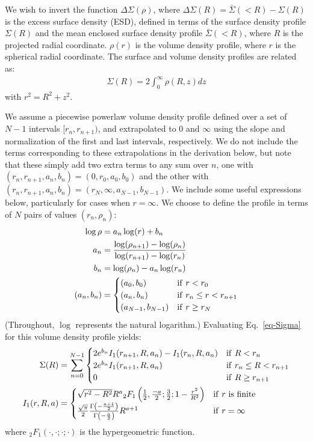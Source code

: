 \documentclass{article}
\begin{document}
We wish to invert the function $\Delta\Sigma(\rho)$, where $\Delta\Sigma(R) = \bar{\Sigma}(<R) - \Sigma(R)$ is the excess surface density (ESD), defined in terms of the surface density profile $\Sigma(R)$ and the mean enclosed surface density profile $\bar{\Sigma}(<R)$, where $R$ is the projected radial coordinate. $\rho(r)$ is the volume density profile, where $r$ is the spherical radial coordinate. The surface and volume density profiles are related as:
\begin{align}
  \Sigma(R) = 2\int_0^\infty\rho(R, z)dz\label{eq-Sigma}
\end{align}
with $r^2 = R^2 + z^2$.

We assume a piecewise powerlaw volume density profile defined over a set of $N-1$ intervals $[r_n, r_{n+1})$, and extrapolated to $0$ and $\infty$ using the slope and normalization of the first and last intervals, respectively. We do not include the terms corresponding to these extrapolations in the derivation below, but note that these simply add two extra terms to any sum over $n$, one with $(r_n,r_{n+1},a_n,b_n) = (0, r_0, a_0, b_0)$ and the other with $(r_n,r_{n+1},a_n,b_n) = (r_N, \infty, a_{N-1}, b_{N-1})$. We include some useful expressions below, particularly for cases when $r=\infty$. We choose to define the profile in terms of $N$ pairs of values $(r_n,\rho_n)$:
\begin{align}
  \log\rho &= a_n \log(r) + b_n \\
  a_n &= \frac{\log(\rho_{n+1})-\log(\rho_n)}{\log(r_{n+1})-\log(r_n)}\\
  b_n &= \log(\rho_n) - a_n\log(r_n)\\
  (a_n, b_n) &=
  \begin{cases}
    (a_0, b_0) & {\rm if}\ r < r_0\\
    (a_n, b_n) & {\rm if}\ r_n \leq r < r_{n+1}\\
    (a_{N-1}, b_{N-1}) & {\rm if}\ r \geq r_N
  \end{cases}
\end{align}
(Throughout, $\log$ represents the natural logarithm.) Evaluating Eq.~\ref{eq-Sigma} for this volume density profile yields:
\begin{align}
  \Sigma(R) &= \sum_{n=0}^{N-1}
  \begin{cases}
    2e^{b_n}I_1(r_{n+1}, R, a_n) - I_1(r_n, R, a_n) & {\rm if}\ R < r_n\\
    2e^{b_n}I_1(r_{n+1}, R, a_n) & {\rm if}\ r_n \leq R < r_{n+1}\\
    0 & {\rm if}\ R \geq r_{n+1}\\
  \end{cases} \label{eq-Sigma-discrete}\\
  I_1(r, R, a) &=
  \begin{cases}
    \sqrt{r^2-R^2}R^a{}_2F_1\left(\frac{1}{2},\frac{-a}{2};\frac{3}{2};1-\frac{r^2}{R^2}\right) & {\rm if}\ r\ {\rm is}\ {\rm finite}\\
    \frac{\sqrt{\pi}}{2}\frac{\Gamma\left(-\frac{a+1}{2}\right)}{\Gamma\left(-\frac{a}{2}\right)}R^{a+1} & {\rm if}\ r = \infty
  \end{cases}
\end{align}
where ${}_2F_1(\cdot,\cdot;\cdot;\cdot)$ is the hypergeometric function.
\end{document}
